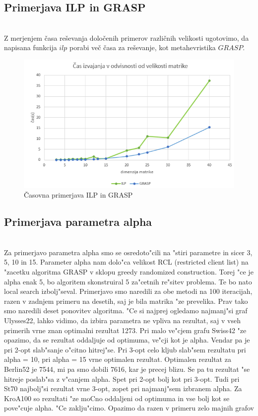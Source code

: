 \documentclass[12pt,a4paper]{amsart}
\theoremstyle{definition} %
\theoremstyle{plain} %
\begin{document}
\subsection{Primerjava ILP in GRASP} ~\\
Z merjenjem časa reševanja določenih primerov različnih velikosti ugotovimo, da napisana funkcija $ilp$ porabi več časa za reševanje, kot metahevristika $GRASP$. 

\begin{figure}[h]
\caption{Časovna primerjava ILP in GRASP}
\centering
\includegraphics[scale =0.8]{casilp}
\end{figure}


\subsection{Primerjava parametra alpha} ~\\
Za primerjavo parametra alpha smo se osredoto"cili na "stiri parametre in sicer 3, 5, 10 in 15. Parameter alpha nam dolo"ca velikost RCL (restricted client list) na "zacetku algoritma GRASP v sklopu greedy randomized construction. Torej "ce je alpha enak 5, bo algoritem skonstruiral 5 za"cetnih re"sitev problema. Te bo nato local search izbolj"seval. Primerjavo smo naredili za obe metodi na 100 iteracijah, razen v zadnjem primeru na desetih, saj je bila matrika "ze prevelika. Prav tako smo naredili deset ponovitev algoritma.
"Ce si najprej ogledamo najmanj"si graf Ulysses22, lahko vidimo, da izbira parametra ne vpliva na rezultat, saj v vseh primerih vrne  znan optimalni rezultat 1273. Pri malo ve"cjem grafu Swiss42 "ze opazimo, da se rezultat oddaljuje od optimuma, ve"cji kot je alpha. Vendar pa je pri 2-opt slab"sanje o"citno hitrej"se. Pri 3-opt celo kljub slab"sem rezultatu pri alpha = 10, pri alpha = 15 vrne optimalen rezultat. Optimalen rezultat za Berlin52 je 7544, mi pa smo dobili 7616, kar je precej blizu. Se pa tu rezultat "se hitreje poslab"sa z v"canjem alpha. Spet pri 2-opt bolj kot pri 3-opt. Tudi pri St70 najbolj"si rezultat vrne 3-opt, zopet pri najmanj"sem izbranem alpha. 
Za KroA100 so rezultati "ze moCno oddaljeni od optimuma in vse bolj kot se pove"cuje alpha. 
"Ce zaklju"cimo. Opazimo da razen v primeru zelo majnih grafov
\end{document}
